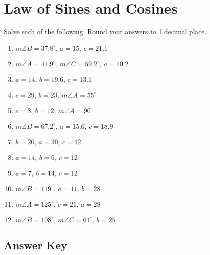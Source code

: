 \chapter{Law of Sines and Cosines}

Solve each of the following. Round your answers to 1 decimal place.

\begin{enumerate}
	\item $m\angle B = 37.8^\circ, \, a = 15, \, c = 21.1$
    \item $m\angle A = 41.9^\circ, \, m\angle C = 59.2^\circ, \, a = 10.2$
    \item $a = 14, \, b = 19.6, \, c = 13.1$
    
    \item $c = 29, \, b = 23, \, m\angle A = 55^\circ$
    \item $c = 8, \, b = 12, \, m\angle A = 90^\circ$
    \item $m\angle B = 67.2^\circ, \, a = 15.6, \, c = 18.9$
    \item $b = 20, \, a = 30, \, c = 12$
    \item $a = 14, \, b = 6, \, c = 12$
    \item $a = 7, \, b = 14, \, c = 12$
    \item $m\angle B = 119^\circ, \, a = 11, \, b = 28$
    \item $m\angle A = 125^\circ, \, c = 21, \, a = 28$
    \item $m\angle B = 108^\circ, \, m\angle C = 61^\circ, \, b = 25$
\end{enumerate}

\newpage

\section{Answer Key}

